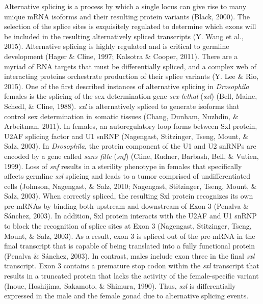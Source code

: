 \documentclass[12pt,oneside]{reedthesis}
\begin{document}
Alternative splicing is a process by which a single locus can give rise
to many unique mRNA isoforms and their resulting protein variants
(Black, 2000). The selection of the splice sites is exquisitely
regulated to determine which exons will be included in the resulting
alternatively spliced transcripts (Y. Wang et al., 2015). Alternative splicing
is highly regulated and is critical to germline development
(Hager \& Cline, 1997; Kalsotra \& Cooper, 2011). There are a myriad of RNA targets that
must be differentially spliced, and a complex web of interacting
proteins orchestrate production of their splice variants (Y. Lee \& Rio, 2015).
One of the first described instances of alternative splicing in
\emph{Drosophila} females is the splicing of the sex determination gene
\emph{sex-lethal} (\emph{sxl}) (Bell, Maine, Schedl, \& Cline, 1988). \emph{sxl} is alternatively spliced to
generate isoforms that control sex determination in somatic tissues
(Chang, Dunham, Nuzhdin, \& Arbeitman, 2011). In females, an autoregulatory loop forms between Sxl
protein, U2AF splicing factor and U1 snRNP (Nagengast, Stitzinger, Tseng, Mount, \& Salz, 2003). In
\emph{Drosophila}, the protein component of the U1 and U2 snRNPs are encoded
by a gene called \emph{sans fille} (\emph{snf}) (Cline, Rudner, Barbash, Bell, \& Vutien, 1999). Loss of \emph{snf}
results in a sterility phenotype in females that specifically affects
germline \emph{sxl} splicing and leads to a tumor comprised of
undifferentiated cells (Johnson, Nagengast, \& Salz, 2010; Nagengast, Stitzinger, Tseng, Mount, \& Salz, 2003). When
correctly spliced, the resulting Sxl protein recognizes its own
pre-mRNAs by binding both upstream and downstream of Exon 3
(Penalva \& Sánchez, 2003). In addition, Sxl protein interacts with the U2AF and
U1 snRNP to block the recognition of splice sites at Exon 3
(Nagengast, Stitzinger, Tseng, Mount, \& Salz, 2003). As a result, exon 3 is spliced out of the pre-mRNA
in the final transcript that is capable of being translated into a fully
functional protein (Penalva \& Sánchez, 2003). In contrast, males include exon
three in the final \emph{sxl} transcript. Exon 3 contains a premature stop
codon within the \emph{sxl} transcript that results in a truncated protein
that lacks the activity of the female-specific variant (Inoue, Hoshijima, Sakamoto, \& Shimura, 1990).
Thus, \emph{sxl} is differentially expressed in the male and the female gonad
due to alternative splicing events.
\end{document}
